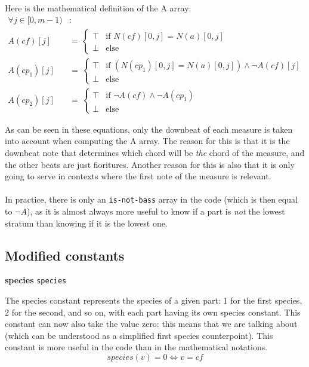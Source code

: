 Here is the mathematical definition of the A array:
\begin{equation}
\begin{aligned}
\forall j \in [0, m-1)& \colon  \\
A(\mathit{cf})[j] &= \,  
\begin{cases}
    \top & \text{if } N(cf)[0,j] = N(a)[0,j] \\
    \bot & \text{else }
\end{cases}\\
A(cp_1)[j] &= \,  
\begin{cases}
    \top & \text{if } (N(cp_1)[0,j] = N(a)[0,j]) \land \neg A(\mathit{cf})[j] \\
    \bot & \text{else }
\end{cases}\\
A(cp_2)[j] &= \,  
\begin{cases}
    \top & \text{if } \neg A(\mathit{cf}) \land \neg A(cp_1)\\
    \bot & \text{else }
\end{cases}
\end{aligned}
\end{equation}

As can be seen in these equations, only the downbeat of each measure is taken into account when computing the A array. The reason for this is that it is the downbeat note that determines which chord will be \textit{the} chord of the measure, and the other beats are just fioritures. Another reason for this is also that it is only going to serve in contexts where the first note of the measure is relevant.

\paragraph{}
In practice, there is only an \texttt{is-not-bass} array in the code (which is then equal to $\neg A$), as it is almost always more useful to know if a part is \textit{not} the lowest stratum than knowing if it is the lowest one. 

\subsection{Modified constants} \label{subsection:modified_constants}
\noindent \textbf{species} \hspace{.2cm} \texttt{species} 

The species constant represents the species of a given part: 1 for the first species, 2 for the second, and so on, with each part having its own species constant. This constant can now also take the value zero: this means that we are talking about \cfs (which can be understood as a simplified first species counterpoint). This constant is more useful in the code than in the mathematical notations.
\begin{equation}
species(v) = 0 \iff v = \mathit{\mathit{cf}}
\end{equation}

